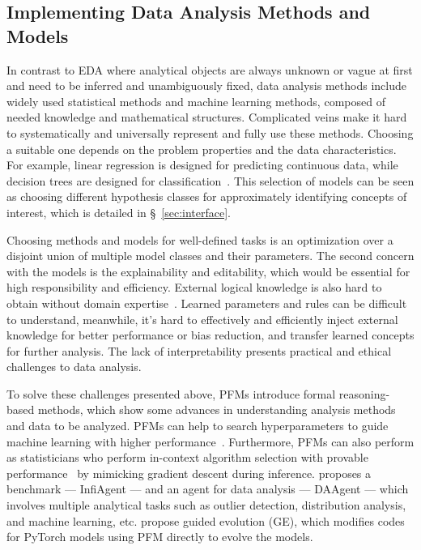   \subsection{Implementing Data Analysis Methods and Models}\label{sec:da_methods}
  
  In contrast to EDA where analytical objects are always unknown or vague at first and need to be inferred and unambiguously fixed, data analysis methods include widely used statistical methods and machine learning methods, composed of needed knowledge and mathematical structures. Complicated veins make it hard to systematically and universally represent and fully use these methods. Choosing a suitable one depends on the problem properties and the data characteristics. For example, linear regression is designed for predicting continuous data, while decision trees are designed for classification~\cite{032hastie2009elements}. This selection of models can be seen as choosing different hypothesis classes for approximately identifying concepts of interest, which is detailed in \S~\ref{sec:interface}. 
  
  Choosing methods and models for well-defined tasks is an optimization over a disjoint union of multiple model classes and their parameters. The second concern with the models is the explainability and editability, which would be essential for high responsibility and efficiency. External logical knowledge is also hard to obtain without domain expertise~\cite{031guyon2003introduction}. Learned parameters and rules can be difficult to understand, meanwhile, it's hard to effectively and efficiently inject external knowledge for better performance or bias reduction, and transfer learned concepts for further analysis. The lack of interpretability presents practical and ethical challenges to data analysis. 
  
  
  To solve these challenges presented above, PFMs introduce formal reasoning-based methods, which show some advances in understanding analysis methods and data to be analyzed. PFMs can help to search hyperparameters to guide machine learning with higher performance~\cite{sayed2024gizaml}. Furthermore, PFMs can also perform as statisticians who perform in-context algorithm selection with provable performance~\cite{bai2024transformers} by mimicking gradient descent during inference. \cite{HuZWCM0WSXZCY0K24} proposes a benchmark — InfiAgent — and an agent for data analysis — DAAgent — which involves multiple analytical tasks such as outlier detection, distribution analysis, and machine learning, etc. \cite{EoTGE} propose guided evolution (GE), which modifies codes for PyTorch models using PFM directly to evolve the models. 
  
